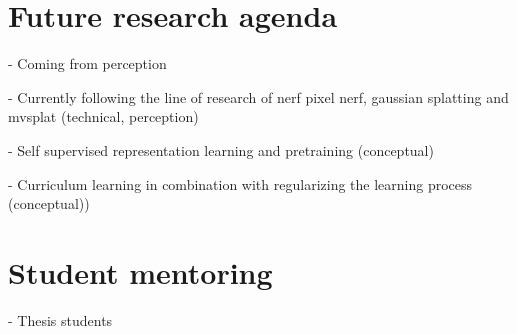 \section{Future research agenda}
- Coming from perception

- Currently following the line of research of nerf pixel nerf, gaussian splatting and mvsplat (technical, perception)

- Self supervised representation learning and pretraining (conceptual)

- Curriculum learning in combination with regularizing the learning process (conceptual))
\section{Student mentoring}
- Thesis students